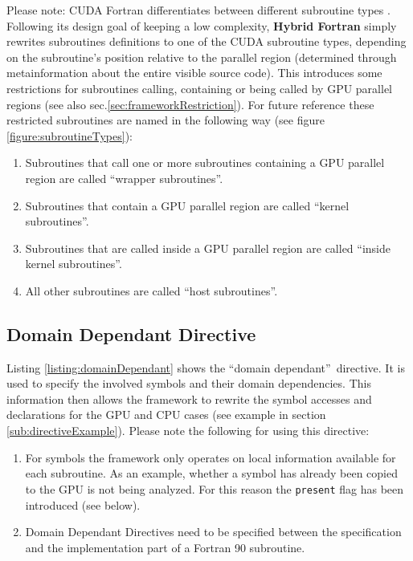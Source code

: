 Please note: CUDA Fortran differentiates between different subroutine types \cite[p. 4]{CUDAFortranGuide}. Following its design goal of keeping a low complexity, \textbf{Hybrid Fortran} simply rewrites subroutines definitions to one of the CUDA subroutine types, depending on the subroutine's position relative to the parallel region (determined through metainformation about the entire visible source code). This introduces some restrictions for subroutines calling, containing or being called by GPU parallel regions (see also sec.\ref{sec:frameworkRestriction}). For future reference these restricted subroutines are named in the following way (see figure \ref{figure:subroutineTypes}):
\begin{enumerate}
  \item Subroutines that call one or more subroutines containing a GPU parallel region are called \textquotedblleft wrapper subroutines\textquotedblright.
  \item Subroutines that contain a GPU parallel region are called \textquotedblleft kernel subroutines\textquotedblright.
  \item Subroutines that are called inside a GPU parallel region are called \textquotedblleft inside kernel subroutines\textquotedblright.
  \item All other subroutines are called \textquotedblleft host subroutines\textquotedblright.
\end{enumerate}

\subsection{Domain Dependant Directive} \label{sub:domainDependantDirective}

Listing \ref{listing:domainDependant} shows the \textquotedblleft domain dependant\textquotedblright\ directive. It is used to specify the involved symbols and their domain dependencies. This information then allows the framework to rewrite the symbol accesses and declarations for the GPU and CPU cases (see example in section \ref{sub:directiveExample}). Please note the following for using this directive:
\begin{enumerate}
 \item For symbols the framework only operates on local information available for each subroutine. As an example, whether a symbol has already been copied to the GPU is not being analyzed. For this reason the \verb|present| flag has been introduced (see below).
 \item Domain Dependant Directives need to be specified between the specification and the implementation part of a Fortran 90 subroutine.
\end{enumerate}

